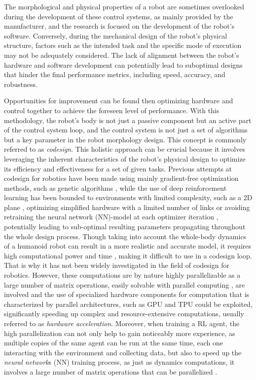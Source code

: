 The morphological and physical properties of a robot are sometimes overlooked during the development of these control systems, as mainly provided by the manufacturer, and the research is focused on the development of the robot's software. Conversely, during the mechanical design of the robot's physical structure, factors such as the intended task and the specific mode of execution may not be adequately considered. The lack of alignment between the robot's hardware and software development can potentially lead to suboptimal designs that hinder the final performance metrics, including speed, accuracy, and robustness.

Opportunities for improvement can be found then optimizing hardware and control together to achieve the foreseen level of performance. With this methodology, the robot's body is not just a passive component but an active part of the control system loop, and the control system is not just a set of algorithms but a key parameter in the robot morphology design. This concept is commonly referred to as \textit{codesign}. This holistic approach can be crucial because it involves leveraging the inherent characteristics of the robot's physical design to optimize its efficiency and effectiveness for a set of given tasks. Previous attempts at codesign for robotics have been made using mainly gradient-free optimization methods, such as genetic algorithms \citep{sartore_optimization_2022,fadini_simulation_2022}, while the use of deep reinforcement learning has been bounded to environments with limited complexity, such as a 2D plane \citep{ha_reinforcement_2019}, optimizing simplified hardware with a limited number of links \citep{chen_hardware_2020} or avoiding retraining the neural network (\ac{NN})-model at each optimizer iteration \citep{bjelonic_learning-based_2023}, potentially leading to sub-optimal resulting parameters propagating throughout the whole design process. Though taking into account the whole-body dynamics of a humanoid robot can result in a more realistic and accurate model, it requires high computational power and time \citep{ramuzat_benchmarking_2022}, making it difficult to use in a codesign loop. That is why it has not been widely investigated in the field of codesign for robotics. However, these computations are by nature highly parallelizable as a large number of matrix operations, easily solvable with parallel computing \citep{gyawali_comparative_2023, tuma_2023}, are involved and the use of specialized hardware components for computation that is characterized by parallel architectures, such as \ac{GPU} and \ac{TPU} could be exploited, significantly speeding up complex and resource-extensive computations, usually referred to as \textit{hardware acceleration}. Moreover, when training a \ac{RL} agent, the high parallelization can not only help to gain noticeably more experience, as multiple copies of the same agent can be run at the same time, each one interacting with the environment and collecting data, but also to speed up the \textit{neural network}s (\ac{NN}) training process, as just as dynamics computations, it involves a large number of matrix operations that can be parallelized \citep{pandey_transformational_2022,gyawali_comparative_2023}.

